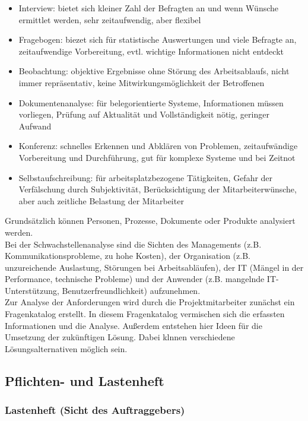 \documentclass[a4paper, 12pt]{report}
\begin{document}
\begin{itemize}
    \item Interview: bietet sich kleiner Zahl der Befragten an und wenn Wünsche
	ermittlet werden, sehr zeitaufwendig, aber flexibel
    \item Fragebogen: biezet sich für statistische Auswertungen und viele
	Befragte an, zeitaufwendige Vorbereitung, evtl. wichtige Informationen
	nicht entdeckt
    \item Beobachtung: objektive Ergebnisse ohne Störung des Arbeitsablaufs,
	nicht immer repräsentativ, keine Mitwirkungsmöglichkeit der Betroffenen
    \item Dokumentenanalyse: für belegorientierte Systeme, Informationen müssen
	vorliegen, Prüfung auf Aktualität und Vollständigkeit nötig, geringer
	Aufwand
    \item Konferenz: schnelles Erkennen und Abklären von Problemen,
	zeitaufwändige Vorbereitung und Durchführung, gut für komplexe Systeme
	und bei Zeitnot
    \item Selbstaufschreibung: für arbeitsplatzbezogene Tätigkeiten, Gefahr der
	Verfälschung durch Subjektivität, Berücksichtigung der
	Mitarbeiterwünsche, aber auch zeitliche Belastung der Mitarbeiter
\end{itemize}

Grundsätzlich können Personen, Prozesse, Dokumente oder Produkte analysiert
werden. \\

Bei der Schwachstellenanalyse sind die Sichten des Managements (z.B.
Kommunikationsprobleme, zu hohe Kosten), der Organisation (z.B. unzureichende
Auslastung, Störungen bei Arbeitsabläufen), der IT (Mängel in der Performance,
technische Probleme) und der Anwender (z.B. mangelnde IT-Unterstützung,
Benutzerfreundlichkeit) aufzunehmen. \\

Zur Analyse der Anforderungen wird durch die Projektmitarbeiter zunächst ein
Fragenkatalog erstellt. In diesem Fragenkatalog vermischen sich die erfassten
Informationen und die Analyse. Außerdem entstehen hier Ideen für die Umsetzung
der zukünftigen Lösung. Dabei klnnen verschiedene Lösungsalternativen möglich
sein. \\

\subsection{Pflichten- und Lastenheft}

\subsubsection{Lastenheft (Sicht des Auftraggebers)}
\end{document}
